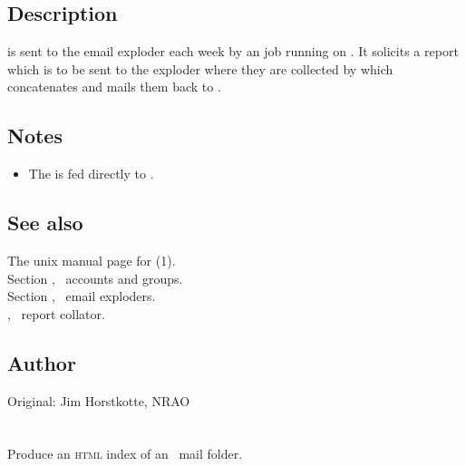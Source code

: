 \subsection*{Description}

 is sent to the \mbox{} email
exploder each week by an   job running on
.  It solicits a report which is to be sent to the
\mbox{} exploder where they are collected by 
which concatenates and mails them back to \mbox{}.

\subsection*{Notes}
 
\begin{itemize}
\item
   The  is fed directly to .
\end{itemize}

\subsection*{See also}
 
The unix manual page for (1).\\
Section , \aipspp\ accounts and groups.\\
Section , \aipspp\ email exploders.\\
, \aipspp\ report collator.
 
\subsection*{Author}
 
Original: Jim Horstkotte, NRAO
 

\newpage
\section{}
\label{scanhtml}



Produce an \textsc{html} index of an \aipspp\ mail folder.


